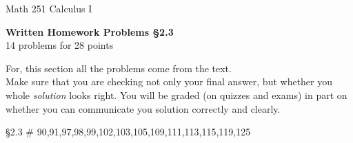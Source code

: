 \documentclass[11pt]{report}
\theoremstyle{plain}
\begin{document}
\hfill Math 251 Calculus I
\begin{center}
\Large{\textbf{Written Homework Problems \S 2.3}} \\
14 problems for 28 points\\
\end{center}

For, this section all the problems come from the text. \\


Make sure that you are checking not only your final answer, but whether you whole \emph{solution} looks right. You will be graded (on quizzes and exams) in part on whether you can communicate you solution correctly and clearly.\\

\begin{description}
\item{\S 2.3} \# 90,91,97,98,99,102,103,105,109,111,113,115,119,125
\end{description}
\end{document}
